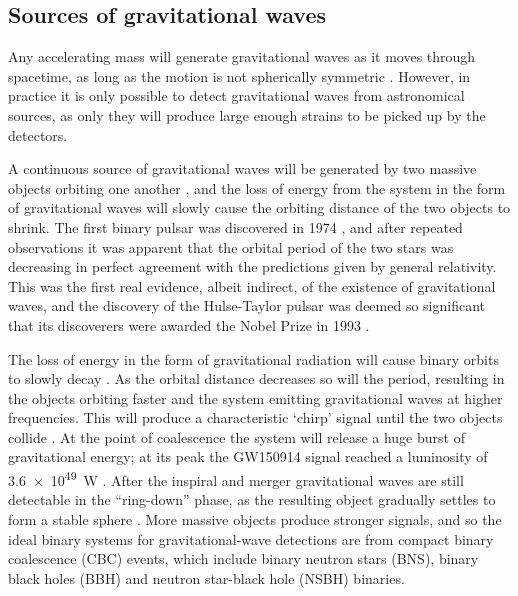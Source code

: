 
\subsection{Sources of gravitational waves}
\label{sec:gw_sources}
\begin{colsection}

Any accelerating mass will generate gravitational waves as it moves through spacetime, as long as the motion is not spherically symmetric \citep[such as a rotating disk or a uniformly expanding sphere;][]{BIGcardiff,BIGparis}. However, in practice it is only possible to detect gravitational waves from astronomical sources, as only they will produce large enough strains to be picked up by the detectors.

A continuous source of gravitational waves will be generated by two massive objects orbiting one another \citep{GW_sources}, and the loss of energy from the system in the form of gravitational waves will slowly cause the orbiting distance of the two objects to shrink. The first binary pulsar was discovered in 1974 \citep{HulseTaylor}, and after repeated observations it was apparent that the orbital period of the two stars was decreasing in perfect agreement with the predictions given by general relativity. This was the first real evidence, albeit indirect, of the existence of gravitational waves, and the discovery of the Hulse-Taylor pulsar was deemed so significant that its discoverers were awarded the Nobel Prize in 1993 \citep{HulseTaylor2}.

The loss of energy in the form of gravitational radiation will cause binary orbits to slowly decay \citep[unless counteracted by another process, such as mass transfer;][]{binary_masstransfer}. As the orbital distance decreases so will the period, resulting in the objects orbiting faster and the system emitting gravitational waves at higher frequencies. This will produce a characteristic `chirp' signal until the two objects collide \citep{GW_sources, BIGparis}. At the point of coalescence the system will release a huge burst of gravitational energy; at its peak the GW150914 signal reached a luminosity of \SI{3.6e49}{\watt} \citep[greater than the combined luminosity of all stars in the observable universe;][]{GW150914}. After the inspiral and merger gravitational waves are still detectable in the ``ring-down'' phase, as the resulting object gradually settles to form a stable sphere \citep{GW_ringdown}. More massive objects produce stronger signals, and so the ideal binary systems for gravitational-wave detections are from compact binary coalescence (CBC)  events, which include binary neutron stars  (BNS), binary black holes  (BBH) and neutron star-black hole (NSBH)  binaries.


\end{colsection}
